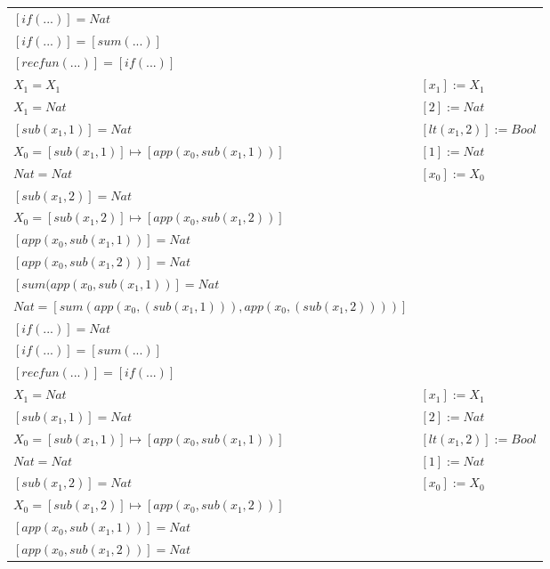 \begin{exercise}
\begin{description}
\begin{center}
\begin{longtable}{ | l | l | }
                        $[if(...)] = Nat$ & \\
                        $[if(...)] = [sum(...)]$ & \\
                        $[recfun(...)] =  [if(...)]$ & \\
                    \hline
                        $X_1 = X_1$ & $[x_1] := X_1$ \\
                        $X_1 = Nat$ & $[2] := Nat$ \\
                        $[sub(x_1,1)] = Nat$ & $[lt(x_1 , 2)] := Bool$  \\
                        $X_0 = [sub(x_1,1)] \mapsto [app(x_0, sub(x_1,1))]$ &  $[1] := Nat$\\
                        $Nat = Nat$ & $[x_0] := X_0$ \\
                        $[sub(x_1,2)] = Nat$ & \\
                        $X_0 = [sub(x_1,2)] \mapsto [app(x_0, sub(x_1,2))]$ & \\
                        $[app(x_0, sub(x_1,1))] = Nat$ & \\
                        $[app(x_0, sub(x_1,2))] = Nat$ & \\
                        $[sum(app(x_0, sub(x_1,1))] = Nat$ & \\
                        $Nat = [sum(app(x_0, (sub(x_1,1))), app(x_0, (sub(x_1,2))))]$ & \\
                        $[if(...)] = Nat$ & \\
                        $[if(...)] = [sum(...)]$ & \\
                        $[recfun(...)] =  [if(...)]$ & \\
                    \hline
                        $X_1 = Nat$ &  $[x_1] := X_1$ \\
                        $[sub(x_1,1)] = Nat$ & $[2] := Nat$ \\
                        $X_0 = [sub(x_1,1)] \mapsto [app(x_0, sub(x_1,1))]$ &  $[lt(x_1 , 2)] := Bool$ \\
                        $Nat = Nat$ & $[1] := Nat$ \\
                        $[sub(x_1,2)] = Nat$ & $[x_0] := X_0$ \\
                        $X_0 = [sub(x_1,2)] \mapsto [app(x_0, sub(x_1,2))]$ &  \\
                        $[app(x_0, sub(x_1,1))] = Nat$ & \\
                        $[app(x_0, sub(x_1,2))] = Nat$ & \\

\end{longtable}
\end{center}
\end{description}
\end{exercise}
